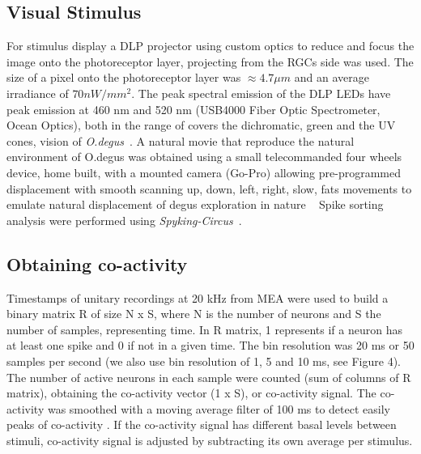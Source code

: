 \documentclass[9pt,twocolumn,twoside,lineno]{pnas-new}
\begin{document}
{\subsection*{Visual Stimulus}
For stimulus display a DLP projector  using custom optics to reduce and focus the image onto the photoreceptor layer, projecting from the RGCs side was used. The size of a pixel onto the photoreceptor layer was $\approx 4.7 \mu m$ and an average irradiance of $70 nW/mm^{2}$. The peak spectral emission of the DLP LEDs have peak emission at 460 nm and 520 nm (USB4000 Fiber Optic Spectrometer, Ocean Optics), both in the range of covers the dichromatic, green and the UV cones, vision of \textit{O.degus}~\citep{Chavez:2003bn}. A natural movie that reproduce the natural environment of O.degus was obtained using a small telecommanded four wheels device, home built, with a mounted camera (Go-Pro) allowing  pre-programmed displacement with smooth scanning up, down, left, right, slow, fats movements to emulate natural displacement of degus exploration in nature ~\citep{Vasquez:2020} Spike sorting analysis were performed using \textit{Spyking-Circus}~\citep{Yger:2018hy}.

\subsection*{Obtaining co-activity}
Timestamps of unitary recordings at 20 kHz from MEA were used to build a binary matrix R of size N x S, where N is the number of neurons and S the number of samples, representing time. In R matrix, 1 represents if a neuron has at least one spike and 0 if not in a given time. The bin resolution was 20 ms or 50 samples per second (we also use bin resolution of 1, 5 and 10 ms, see Figure 4). The number of active neurons in each sample were counted (sum of columns of R matrix), obtaining the co-activity vector (1 x S), or co-activity signal. The co-activity was smoothed with a moving average filter of 100 ms to detect easily peaks of co-activity . If the co-activity signal has different basal levels between stimuli, co-activity signal is adjusted by subtracting its own average per stimulus.

}
\end{document}
